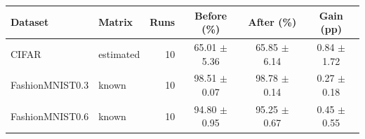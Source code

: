 \begin{tabular}{llrccc}
Dataset & Matrix & Runs & Before (\%) & After (\%) & Gain (pp) \\
\hline
CIFAR & estimated & 10 & 65.01 $\pm$ 5.36 & 65.85 $\pm$ 6.14 & 0.84 $\pm$ 1.72\\
FashionMNIST0.3 & known & 10 & 98.51 $\pm$ 0.07 & 98.78 $\pm$ 0.14 & 0.27 $\pm$ 0.18\\
FashionMNIST0.6 & known & 10 & 94.80 $\pm$ 0.95 & 95.25 $\pm$ 0.67 & 0.45 $\pm$ 0.55\\
\end{tabular}
